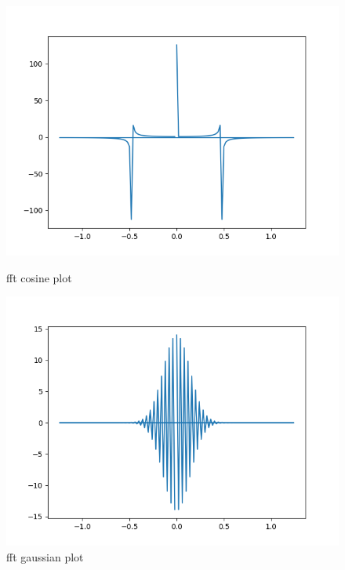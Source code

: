 \documentclass[a4paper,11pt,english]{article}
\begin{document}
\begin{enumerate}
\begin{enumerate}
\begin{figure}[H]
			\includegraphics[width=\linewidth]{cgp/cosines_fft}
			\caption{fft cosine plot}
			\endminipage \hfill
			\includegraphics[width=\linewidth]{cgp/gauss_fft}
			\caption{fft gaussian plot}
			\endminipage \hfill
		\end{figure}
			

\end{enumerate}
\end{enumerate}
\end{document}
